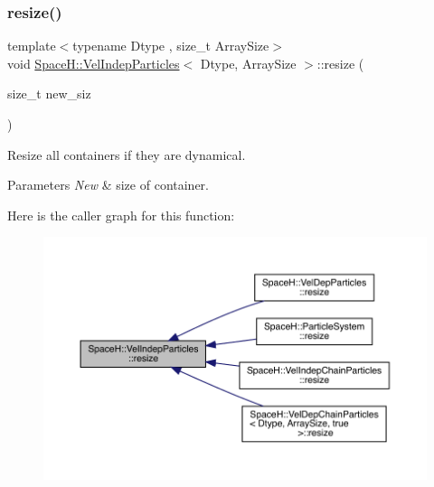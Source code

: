 \subsubsection{\texorpdfstring{resize()}{resize()}}
{\footnotesize\ttfamily template$<$typename Dtype , size\+\_\+t Array\+Size$>$ \\
void \mbox{\hyperlink{class_space_h_1_1_vel_indep_particles}{Space\+H\+::\+Vel\+Indep\+Particles}}$<$ Dtype, Array\+Size $>$\+::resize (\begin{DoxyParamCaption}\item[{size\+\_\+t}]{new\+\_\+siz }\end{DoxyParamCaption})\hspace{0.3cm}{\ttfamily [inline]}}



Resize all containers if they are dynamical. 


\begin{DoxyParams}{Parameters}
{\em New} & size of container. \\
\hline
\end{DoxyParams}
Here is the caller graph for this function\+:
\nopagebreak
\begin{figure}[H]
\begin{center}
\leavevmode
\includegraphics[width=350pt]{class_space_h_1_1_vel_indep_particles_a4f3fe32c740780625671b9a6a0737004_icgraph}
\end{center}
\end{figure}
\mbox{\label{class_space_h_1_1_vel_indep_particles_a417f0f6f338f78fac494a2f5bb471d1d}} 
